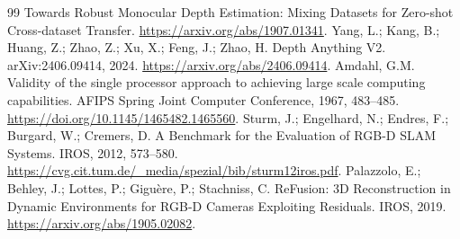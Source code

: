 \documentclass[mathematics,article,submit,moreauthors]{Definitions/mdpi}
\begin{document}
\begin{thebibliography}{99}
Towards Robust Monocular Depth Estimation: Mixing Datasets for Zero-shot Cross-dataset Transfer.
\url{https://arxiv.org/abs/1907.01341}.
 Yang, L.; Kang, B.; Huang, Z.; Zhao, Z.; Xu, X.; Feng, J.; Zhao, H.
Depth Anything V2. arXiv:2406.09414, 2024. \url{https://arxiv.org/abs/2406.09414}.
 Amdahl, G.M. Validity of the single processor approach to achieving
large scale computing capabilities. AFIPS Spring Joint Computer Conference, 1967, 483--485.
\url{https://doi.org/10.1145/1465482.1465560}.
 Sturm, J.; Engelhard, N.; Endres, F.; Burgard, W.; Cremers, D.
A Benchmark for the Evaluation of RGB-D SLAM Systems. IROS, 2012, 573--580.
\url{https://cvg.cit.tum.de/_media/spezial/bib/sturm12iros.pdf}.
 Palazzolo, E.; Behley, J.; Lottes, P.; Gigu\`ere, P.; Stachniss, C.
ReFusion: 3D Reconstruction in Dynamic Environments for RGB-D Cameras Exploiting Residuals.
IROS, 2019. \url{https://arxiv.org/abs/1905.02082}.
\end{thebibliography}
\end{document}
